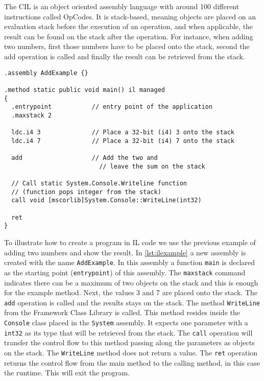 %
The CIL is an object oriented assembly language with around 100 different instructions called OpCodes.
It is stack-based, meaning objects are placed on an evaluation stack before the execution of an operation, and when applicable, the result can be found on the  stack after the operation.
For instance, when adding two numbers, first those numbers have to be placed onto the stack, second the add operation is called and finally the result can be retrieved from the stack.

\begin{lstlisting}[language=CIL,style=listing,caption={Adding example in IL code},label={lst:ilexample}]
.assembly AddExample {}

.method static public void main() il managed
{
  .entrypoint           // entry point of the application
  .maxstack 2

  ldc.i4 3              // Place a 32-bit (i4) 3 onto the stack
  ldc.i4 7              // Place a 32-bit (i4) 7 onto the stack
	
  add                   // Add the two and 
	                      // leave the sum on the stack
  
  // Call static System.Console.Writeline function
  // (function pops integer from the stack)
  call void [mscorlib]System.Console::WriteLine(int32)

  ret
}
\end{lstlisting}

To illustrate how to create a \dotNET program in IL code we use the previous example of adding two numbers and show the result.
In \autoref{lst:ilexample} a new assembly is created with the name \lstinline|AddExample|.
In this assembly a function \lstinline|main| is declared as the starting point (\lstinline|entrypoint|) of this assembly.
The \lstinline|maxstack| command indicates there can be a maximum of two objects on the stack and this is enough for the example method.
Next, the values 3 and 7 are placed onto the stack. The \lstinline|add| operation is called and the results stays on the stack.
The method \lstinline|WriteLine| from the \dotNET Framework Class Library is called.
This method resides inside the \lstinline|Console| class placed in the \lstinline|System| assembly.
It expects one parameter with a \lstinline|int32| as its type that will be retrieved from the stack.
The \lstinline|call| operation will transfer the control flow to this method passing along the parameters as objects on the stack.
The \lstinline|WriteLine| method does not return a value.
The \lstinline|ret| operation returns the control flow from the main method to the calling method, in this case the runtime.
This will exit the program.

